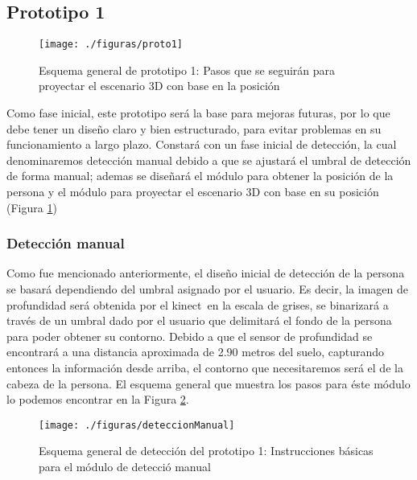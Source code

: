 \documentclass[a4paper,openright,12pt]{report}
\begin{document}
\subsection{Prototipo 1}
\begin{figure}[th]
	\centering
	\texttt{[image: ./figuras/proto1]}
	\caption[Esquema general de prototipo 1]{Esquema general de prototipo 1: Pasos que se seguirán para proyectar el escenario 3D con base en la posición} \label{fig:proto1}
\end{figure}
Como fase inicial, este prototipo será la base para mejoras futuras, por lo que debe tener un diseño claro y bien estructurado, para evitar problemas en su funcionamiento a largo plazo. Constará con un fase inicial de detección, la cual denominaremos detección manual debido a que se ajustará el umbral de detección de forma manual; ademas se diseñará el módulo para obtener la posición de la persona y el módulo para proyectar el escenario 3D con base en su posición (Figura \ref{fig:proto1})

\subsubsection{Detección manual}
Como fue mencionado anteriormente, el diseño inicial de detección de la persona se basará dependiendo del umbral asignado por el usuario. Es decir, la imagen de profundidad será obtenida por el kinect\textcopyright\ en la escala de grises, se binarizará a través de un umbral dado por el usuario que delimitará el fondo de la persona para poder obtener su contorno. Debido a que el sensor de profundidad se encontrará a una distancia aproximada de 2.90 metros del suelo, capturando entonces la información desde arriba, el contorno que necesitaremos será el de la cabeza de la persona. El esquema general que muestra los pasos para éste módulo lo podemos encontrar en la Figura \ref{fig:deteccManual}.
\begin{figure}[th]
	\centering
	\texttt{[image: ./figuras/deteccionManual]}
	\caption[Esquema general de detección del prototipo 1]{Esquema general de detección del prototipo 1: Instrucciones básicas para el módulo de detecció manual} \label{fig:deteccManual}
\end{figure}
\end{document}
